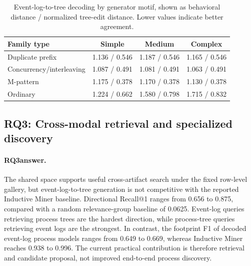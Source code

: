 \documentclass[pdflatex,sn-basic]{sn-jnl}
\newcommand{\RQthree}{\textbf{RQ3}}
\begin{document}
\begin{table}[!t]
\centering
\caption{Event-log-to-tree decoding by generator motif, shown as behavioral distance / normalized tree-edit distance. Lower values indicate better agreement.}
\label{tab:motif-decode}
\begin{tabular}{@{}lccc@{}}
\toprule
Family type & Simple & Medium & Complex \\
\midrule
Duplicate prefix & 1.136 / 0.546 & 1.187 / 0.546 & 1.165 / 0.546 \\
Concurrency/interleaving & 1.087 / 0.491 & 1.081 / 0.491 & 1.063 / 0.491 \\
M-pattern & 1.175 / 0.378 & 1.170 / 0.378 & 1.130 / 0.378 \\
Ordinary & 1.224 / 0.662 & 1.580 / 0.798 & 1.715 / 0.832 \\
\bottomrule
\end{tabular}
\end{table}

\subsection{\RQthree: Cross-modal retrieval and specialized discovery}

\paragraph{\RQthree answer.}
The shared space supports useful cross-artifact search under the fixed row-level gallery, but event-log-to-tree generation is not competitive with the reported Inductive Miner baseline. Directional Recall@1 ranges from 0.656 to 0.875, compared with a random relevance-group baseline of 0.0625. Event-log queries retrieving process trees are the hardest direction, while process-tree queries retrieving event logs are the strongest. In contrast, the footprint F1 of decoded event-log process models ranges from 0.649 to 0.669, whereas Inductive Miner reaches 0.938 to 0.996. The current practical contribution is therefore retrieval and candidate proposal, not improved end-to-end process discovery.
\end{document}
